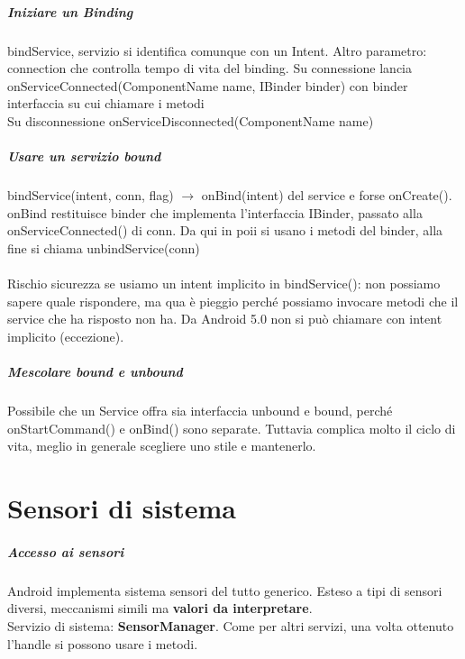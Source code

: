 \documentclass[10pt]{book}
\begin{document}
\paragraph{Iniziare un Binding} bindService, servizio si identifica comunque con un Intent. Altro parametro: connection che controlla tempo di vita del binding. Su connessione lancia onServiceConnected(ComponentName name, IBinder binder) con binder interfaccia su cui chiamare i metodi\\
Su disconnessione onServiceDisconnected(ComponentName name)
\paragraph{Usare un servizio bound} bindService(intent, conn, flag) $\rightarrow$ onBind(intent) del service e forse onCreate(). onBind restituisce binder che implementa l'interfaccia IBinder, passato alla onServiceConnected() di conn. Da qui in poii si usano i metodi del binder, alla fine si chiama unbindService(conn)\\\\
Rischio sicurezza se usiamo un intent implicito in bindService(): non possiamo sapere quale rispondere, ma qua è pieggio perché possiamo invocare metodi che il service che ha risposto non ha. Da Android 5.0 non si può chiamare con intent implicito (eccezione).
\paragraph{Mescolare bound e unbound} Possibile che un Service offra sia interfaccia unbound e bound, perché onStartCommand() e onBind() sono separate. Tuttavia complica molto il ciclo di vita, meglio in generale scegliere uno stile e mantenerlo.
\chapter{Sensori di sistema}
\paragraph{Accesso ai sensori} Android implementa sistema sensori del tutto generico. Esteso a tipi di sensori diversi, meccanismi simili ma \textbf{valori da interpretare}.\\
Servizio di sistema: \textbf{SensorManager}. Come per altri servizi, una volta ottenuto l'handle si possono usare i metodi.
\end{document}

